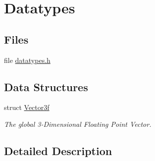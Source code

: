 \hypertarget{group__datatypes}{\section{Datatypes}
\label{group__datatypes}
}
\subsection*{Files}
\begin{DoxyCompactItemize}
\item 
file \hyperlink{datatypes_8h}{datatypes.\-h}
\end{DoxyCompactItemize}
\subsection*{Data Structures}
\begin{DoxyCompactItemize}
\item 
struct \hyperlink{struct_vector3f}{Vector3f}
\begin{DoxyCompactList}\small\item\em The global 3-\/\-Dimensional Floating Point Vector. \end{DoxyCompactList}\end{DoxyCompactItemize}


\subsection{Detailed Description}
